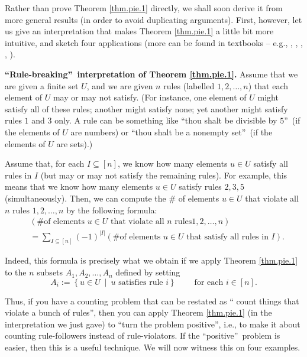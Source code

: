 Rather than prove Theorem \ref{thm.pie.1} directly, we shall soon derive it
from more general results (in order to avoid duplicating arguments). First,
however, let us give an interpretation that makes Theorem \ref{thm.pie.1} a
little bit more intuitive, and sketch four applications (more can be found in
textbooks -- e.g., \cite[\S 2.1]{Sagan19}, \cite[Chapter 2]{Stanley-EC1},
\cite[Chapter 3]{Wildon19}, \cite[Chapter 6]{AndFen04}, \cite[\S 2.9]{19fco}).

\begin{statement}
\textbf{\textquotedblleft Rule-breaking\textquotedblright\ interpretation of
Theorem \ref{thm.pie.1}.} Assume that we are given a finite set $U$, and we
are given $n$ rules (labelled $1,2,\ldots,n$) that each element of $U$ may or
may not satisfy. (For instance, one element of $U$ might satisfy all of these
rules; another might satisfy none; yet another might satisfy rules $1$ and $3$
only. A rule can be something like \textquotedblleft thou shalt be divisible
by $5$\textquotedblright\ (if the elements of $U$ are numbers) or
\textquotedblleft thou shalt be a nonempty set\textquotedblright\ (if the
elements of $U$ are sets).)

Assume that, for each $I\subseteq\left[  n\right]  $, we know how many
elements $u\in U$ satisfy all rules in $I$ (but may or may not satisfy the
remaining rules). For example, this means that we know how many elements $u\in
U$ satisfy rules $2,3,5$ (simultaneously). Then, we can compute the \# of
elements $u\in U$ that violate all $n$ rules $1,2,\ldots,n$ by the following
formula:%
\begin{align*}
&  \left(  \text{\# of elements }u\in U\text{ that violate all }n\text{ rules
}1,2,\ldots,n\right) \\
&  =\sum_{I\subseteq\left[  n\right]  }\left(  -1\right)  ^{\left\vert
I\right\vert }\left(  \text{\# of elements }u\in U\text{ that satisfy all
rules in }I\right)  .
\end{align*}


Indeed, this formula is precisely what we obtain if we apply Theorem
\ref{thm.pie.1} to the $n$ subsets $A_{1},A_{2},\ldots,A_{n}$ defined by
setting%
\[
A_{i}:=\left\{  u\in U\ \mid\ u\text{ satisfies rule }i\right\}
\ \ \ \ \ \ \ \ \ \ \text{for each }i\in\left[  n\right]  .
\]

\end{statement}

Thus, if you have a counting problem that can be restated as \textquotedblleft
count things that violate a bunch of rules\textquotedblright, then you can
apply Theorem \ref{thm.pie.1} (in the interpretation we just gave) to
\textquotedblleft turn the problem positive\textquotedblright, i.e., to make
it about counting rule-followers instead of rule-violators. If the
\textquotedblleft positive\textquotedblright\ problem is easier, then this is
a useful technique. We will now witness this on four examples.

